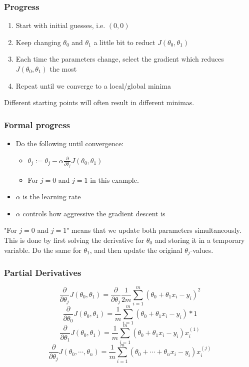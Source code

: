 \subsubsection{Progress}
\begin{enumerate}
    \item Start with initial guesses, i.e. $(0, 0)$
    \item Keep changing $\theta_0$ and $\theta_1$ a little bit to reduct $J(\theta_0, \theta_1)$
    \item Each time the parameters change, select the gradient which reduces $J(\theta_0, \theta_1)$ the most
    \item Repeat until we converge to a local/global minima
\end{enumerate}
Different starting points will often result in different minimas.

\subsubsection{Formal progress}
\begin{itemize}
    \item Do the following until convergence:
    \begin{itemize}
        \item $\theta_j:=\theta_j-\alpha\frac{\partial}{\partial\theta_j}J(\theta_0, \theta_1)$
        \item For $j=0$ and $j=1$ in this example.
    \end{itemize}
    \item $\alpha$ is the learning rate
    \item $\alpha$ controls how aggressive the gradient descent is
\end{itemize}

"For $j=0$ and $j=1$" means that we update both parameters simultaneously. This is done by first solving the derivative for $\theta_0$ and storing it in a temporary variable. Do the same for $\theta_1$, and then update the original $\theta_j$-values.

\subsubsection{Partial Derivatives}
\[
    \frac{\partial}{\partial \theta_j}J(\theta_0, \theta_1) = \frac{\partial}{\partial\theta_j}\frac{1}{2m}\sum_{i=1}^m(\theta_0+\theta_1x_i-y_i)^2
\]
\[
    \frac{\partial}{\partial \theta_0}J(\theta_0, \theta_1) = \frac{1}{m}\sum_{i=1}^m(\theta_0+\theta_1x_i-y_i)*1
\]
\[
    \frac{\partial}{\partial \theta_1}J(\theta_0, \theta_1) = \frac{1}{m}\sum_{i=1}^m(\theta_0+\theta_1x_i-y_i)x_i^{(1)}
\]
\[
    \frac{\partial}{\partial \theta_j}J(\theta_0, \cdots, \theta_n) = \frac{1}{m}\sum_{i=1}^m(\theta_0+\cdots+\theta_nx_i-y_i)x_i^{(j)}
\]

